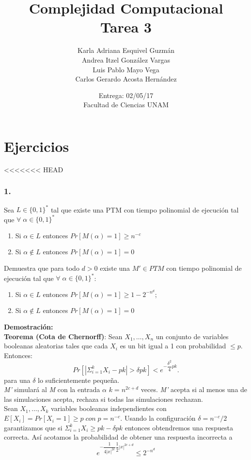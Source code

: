 \documentclass[12pt]{article}
\title{Complejidad Computacional \\ Tarea 3}
\author{Karla Adriana Esquivel Guzmán \\ Andrea Itzel González Vargas\\ Luis Pablo Mayo Vega \\ Carlos Gerardo Acosta Hernández}
\date{Entrega: 02/05/17 \\ Facultad de Ciencias UNAM}
\begin{document}
\maketitle
\section*{Ejercicios}
<<<<<<< HEAD
\subsubsection*{1.}
Sea $L \in \{0,1\}^*$ tal que existe una PTM con tiempo polinomial de ejecución tal que $\forall \; \alpha \in \{0,1\}^*$

\begin{enumerate}[label=\alph*)]
\item Si $\alpha \in L$ entonces $Pr[M(\alpha) = 1] \geq n^{-c}$
\item Si $\alpha \notin L$ entonces $Pr[M(\alpha) = 1] = 0$
\end{enumerate}
Demuestra que para todo $d > 0$ existe una $M' \in PTM$ con tiempo polinomial de ejecución tal que $\forall \;\alpha \in \{0,1\}^*$:
\begin{enumerate}[label=\alph*)]
\item Si $\alpha \in L$ entonces $Pr[M(\alpha) = 1] \geq 1 - 2^{-n^d}$;
\item Si $\alpha \notin L$ entonces $Pr[M(\alpha) = 1] = 0$
\end{enumerate}
\textsf{\textbf{Demostración:}}\\
\textbf{Teorema (Cota de Chernorff)}: Sean $X_1, \dots, X_n$ un conjunto de variables booleanas aleatorias tales que cada $X_i$ es un bit igual a 1 con probabilidad $\leq p$. Entonces:
\[Pr[|\Sigma_{i=1}^k X_i - pk | > \delta pk] < e^{-{\dfrac{\delta^2}4}pk}.\]
para una $\delta$ lo suficientemente pequeña. \\
\textit{M'} simulará al \textit{M} con la entrada $\alpha$ $k=n^{2c+d}$ veces. \textit{M'} acepta si al menos una de las simulaciones acepta, rechaza si todas las simulaciones rechazan.\\
Sean $X_1, \dots, X_k$ variables booleanas independientes con $E[X_i] = Pr[X_i=1] \geq p \; con \; p=n^{-c}$. Usando la configuración $\delta = n ^{-c}/2$ garantizamos que si $\Sigma_{i=1}^k X_i \geq pk - \delta pk$ entonces obtendremos una respuesta correcta. Así acotamos la probabilidad de obtener una respuesta incorrecta a
\[ e^{-{\dfrac{1}{4|x|^{2c}}}\dfrac{1}{2}|x|^{2c+d}} \leq 2^{-n^d} \]
\end{document}

